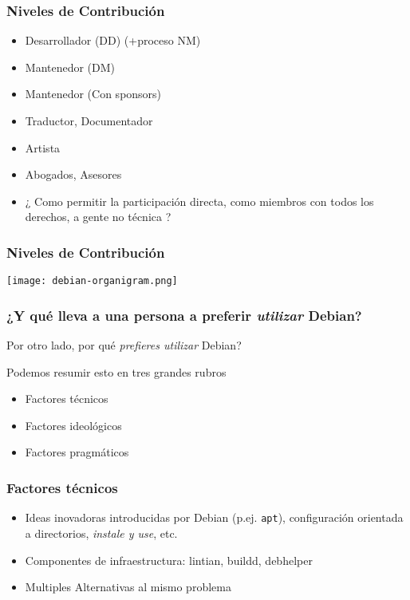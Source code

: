 \documentclass{beamer}
\begin{document}
\begin{frame}
  \frametitle {Niveles de Contribución}
  \begin{itemize}
  \item Desarrollador (DD) (+proceso NM)
  \item Mantenedor (DM)
  \item Mantenedor (Con sponsors)
  \item Traductor, Documentador
  \item Artista
  \item Abogados, Asesores
  \item ¿ Como permitir la participación directa, como miembros con todos los derechos, a gente no técnica ?
  \end{itemize}
\end{frame}

\begin{frame}
  \begin{center}
  \frametitle {Niveles de Contribución}
  \texttt{[image: debian-organigram.png]}
  \end{center}
\end{frame}

\begin{frame}
  \frametitle {¿Y qué lleva a una persona a preferir {\em utilizar}
    Debian?}
  \begin{center}
    Por otro lado, por qué {\em prefieres utilizar} Debian?

    Podemos resumir esto en tres grandes rubros
  \end{center}
  \begin{itemize}
  \item Factores técnicos
  \item Factores ideológicos
  \item Factores pragmáticos
  \end{itemize}
\end{frame}

\begin{frame}
  \frametitle {Factores técnicos}
  \begin{itemize}
  \item Ideas inovadoras introducidas por Debian (p.ej. {\tt apt}),
    configuración orientada a directorios, {\em instale y use}, etc.
  \item Componentes de infraestructura: lintian, buildd, debhelper
  \item Multiples Alternativas al mismo problema
  \end{itemize}
\end{frame}
\end{document}
